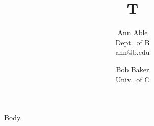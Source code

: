 \documentclass{article}
\title{T}
\author{Ann Able\footremember{zz}{Zebra University.} \\ Dept.\ of B \\ ann@b.edu \and Bob Baker \\ Univ.\ of C}
\begin{document}
\maketitle
Body.
\end{document}
